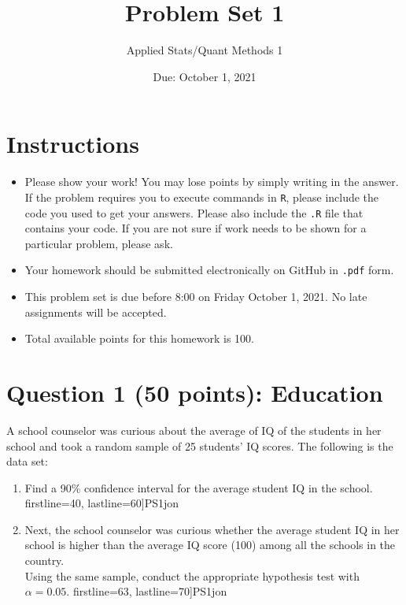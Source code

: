 \documentclass[12pt,letterpaper]{article}
\title{Problem Set 1}
\date{Due: October 1, 2021}
\author{Applied Stats/Quant Methods 1}
\begin{document}
	\maketitle
	
	\section*{Instructions}
	\begin{itemize}
		\item Please show your work! You may lose points by simply writing in the answer. If the problem requires you to execute commands in \texttt{R}, please include the code you used to get your answers. Please also include the \texttt{.R} file that contains your code. If you are not sure if work needs to be shown for a particular problem, please ask.
		\item Your homework should be submitted electronically on GitHub in \texttt{.pdf} form.
		\item This problem set is due before 8:00 on Friday October 1, 2021. No late assignments will be accepted.
		\item Total available points for this homework is 100.
	\end{itemize}
	
	\vspace{1cm}
	\section*{Question 1 (50 points): Education}
	
	A school counselor was curious about the average of IQ of the students in her school and took a random sample of 25 students' IQ scores. The following is the data set:\\
	\vspace{.5cm}
	
	  
	
	\vspace{1cm}
	
	\begin{enumerate}
		\item Find a 90\% confidence interval for the average student IQ in the school.\\
		 firstline=40, lastline=60]{PS1jon}
		\item Next, the school counselor was curious  whether  the average student IQ in her school is higher than the average IQ score (100) among all the schools in the country.\\ 
		\noindent Using the same sample, conduct the appropriate hypothesis test with $\alpha=0.05$.
			 firstline=63, lastline=70]{PS1jon}
	\end{enumerate}
	
\end{document}
